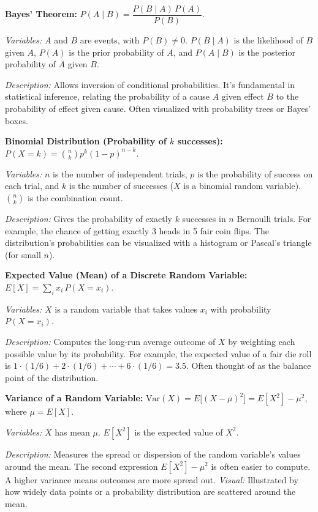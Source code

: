 \documentclass{article}
\begin{document}
\textbf{Bayes’ Theorem:} $P(A \mid B) = \dfrac{P(B \mid A)\,P(A)}{P(B)}$.

\textit{Variables:} $A$ and $B$ are events, with $P(B)\neq0$. $P(B\mid A)$ is the likelihood of $B$ given $A$, $P(A)$ is the prior probability of $A$, and $P(A\mid B)$ is the posterior probability of $A$ given $B$.

\textit{Description:} Allows inversion of conditional probabilities. It’s fundamental in statistical inference, relating the probability of a cause $A$ given effect $B$ to the probability of effect given cause. Often visualized with probability trees or Bayes’ boxes.

\textbf{Binomial Distribution (Probability of $k$ successes):} $P(X = k) = \binom{n}{k} p^k (1-p)^{n-k}$.

\textit{Variables:} $n$ is the number of independent trials, $p$ is the probability of success on each trial, and $k$ is the number of successes ($X$ is a binomial random variable). $\binom{n}{k}$ is the combination count.

\textit{Description:} Gives the probability of exactly $k$ successes in $n$ Bernoulli trials. For example, the chance of getting exactly 3 heads in 5 fair coin flips. The distribution’s probabilities can be visualized with a histogram or Pascal’s triangle (for small $n$).

\textbf{Expected Value (Mean) of a Discrete Random Variable:} $E[X] = \sum_{i} x_i\, P(X = x_i)$.

\textit{Variables:} $X$ is a random variable that takes values $x_i$ with probability $P(X=x_i)$.

\textit{Description:} Computes the long-run average outcome of $X$ by weighting each possible value by its probability. For example, the expected value of a fair die roll is $1\cdot(1/6)+2\cdot(1/6)+\cdots+6\cdot(1/6)=3.5$. Often thought of as the balance point of the distribution.

\textbf{Variance of a Random Variable:} $\displaystyle \mathrm{Var}(X) = E\!\big[(X - \mu)^2\big] = E[X^2] - \mu^2$, where $\mu = E[X]$.

\textit{Variables:} $X$ has mean $\mu$. $E[X^2]$ is the expected value of $X^2$.

\textit{Description:} Measures the spread or dispersion of the random variable’s values around the mean. The second expression $E[X^2] - \mu^2$ is often easier to compute. A higher variance means outcomes are more spread out. \textit{Visual:} Illustrated by how widely data points or a probability distribution are scattered around the mean.
\end{document}
